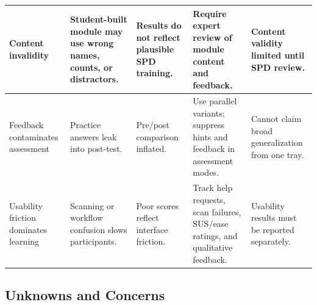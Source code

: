 \documentclass[10pt,a4paper]{article}
\begin{document}
\begin{table}[H]
\begin{tabularx}{\textwidth}{|>{\raggedright\arraybackslash}p{2.2cm}|>{\raggedright\arraybackslash}X|>{\raggedright\arraybackslash}p{2.5cm}|>{\raggedright\arraybackslash}X|>{\raggedright\arraybackslash}p{2.3cm}|}
\hline
Content invalidity & Student-built module may use wrong names, counts, or distractors. & Results do not reflect plausible SPD training. & Require expert review of module content and feedback. & Content validity limited until SPD review. \\
\hline
Feedback contaminates assessment & Practice answers leak into post-test. & Pre/post comparison inflated. & Use parallel variants; suppress hints and feedback in assessment modes. & Cannot claim broad generalization from one tray. \\
\hline
Usability friction dominates learning & Scanning or workflow confusion slows participants. & Poor scores reflect interface friction. & Track help requests, scan failures, SUS/ease ratings, and qualitative feedback. & Usability results must be reported separately. \\
\hline
\end{tabularx}
\end{table}
\subsection{Unknowns and Concerns}
\end{document}
